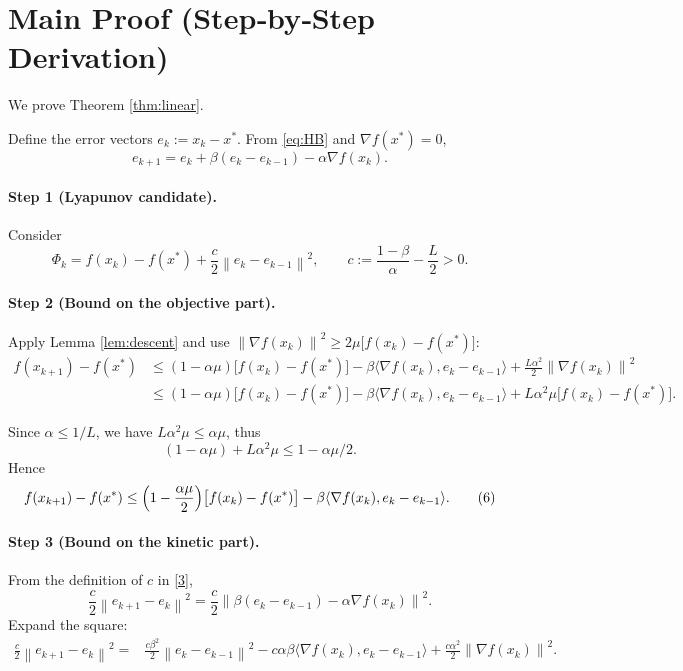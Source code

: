 \documentclass{article}
\newcommand{\norm}[1]{\left\lVert #1\right\rVert}
\newcommand{\ip}[2]{\langle #1,#2\rangle}
\newcommand{\grad}{\nabla}
\begin{document}
\section*{Main Proof (Step‑by‑Step Derivation)}
We prove Theorem \ref{thm:linear}.  

Define the error vectors $e_{k}:=x_{k}-x^{*}$.  
From \eqref{eq:HB} and $\grad f(x^{*})=0$,
\[
e_{k+1}=e_{k}+\beta(e_{k}-e_{k-1})-\alpha\grad f(x_{k}).
\tag{2}
\]

\paragraph{Step 1 (Lyapunov candidate).}
Consider
\[
\Phi_{k}= f(x_{k})-f(x^{*})+\frac{c}{2}\norm{e_{k}-e_{k-1}}^{2},
\qquad c:=\frac{1-\beta}{\alpha}-\frac{L}{2}>0.
\tag{3}
\]

\paragraph{Step 2 (Bound on the objective part).}
Apply Lemma \ref{lem:descent} and use $\norm{\grad f(x_{k})}^{2}\ge 2\mu\bigl[f(x_{k})-f(x^{*})\bigr]$:
\[
\begin{aligned}
f(x_{k+1})-f(x^{*})
&\le (1-\alpha\mu)\bigl[f(x_{k})-f(x^{*})\bigr]
-\beta\ip{\grad f(x_{k})}{e_{k}-e_{k-1}}
+\frac{L\alpha^{2}}{2}\norm{\grad f(x_{k})}^{2}\\
&\le (1-\alpha\mu)\bigl[f(x_{k})-f(x^{*})\bigr]
-\beta\ip{\grad f(x_{k})}{e_{k}-e_{k-1}}
+L\alpha^{2}\mu\bigl[f(x_{k})-f(x^{*})\bigr].
\end{aligned}
\tag{4}
\]

Since $\alpha\le 1/L$, we have $L\alpha^{2}\mu\le\alpha\mu$, thus
\[
(1-\alpha\mu)+L\alpha^{2}\mu\le 1-\alpha\mu/2.
\tag{5}
\]
Hence
\[
f(x_{k+1})-f(x^{*})\le\Bigl(1-\frac{\alpha\mu}{2}\Bigr)\bigl[f(x_{k})-f(x^{*})\bigr]
-\beta\ip{\grad f(x_{k})}{e_{k}-e_{k-1}}.
\tag{6}
\]

\paragraph{Step 3 (Bound on the kinetic part).}
From the definition of $c$ in \eqref{3},
\[
\frac{c}{2}\norm{e_{k+1}-e_{k}}^{2}
= \frac{c}{2}\norm{\beta(e_{k}-e_{k-1})-\alpha\grad f(x_{k})}^{2}.
\tag{7}
\]
Expand the square:
\[
\begin{aligned}
\frac{c}{2}\norm{e_{k+1}-e_{k}}^{2}
=&\frac{c\beta^{2}}{2}\norm{e_{k}-e_{k-1}}^{2}
- c\alpha\beta\ip{\grad f(x_{k})}{e_{k}-e_{k-1}}
+\frac{c\alpha^{2}}{2}\norm{\grad f(x_{k})}^{2}.
\end{aligned}
\tag{8}
\]
\end{document}
